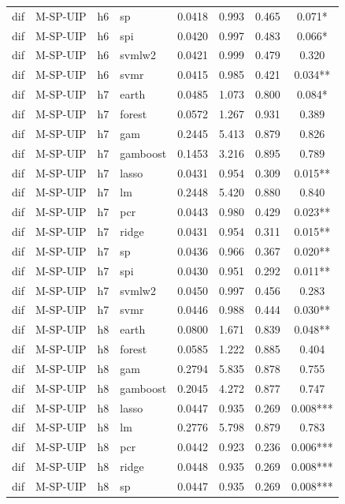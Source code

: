 \begin{ThreePartTable}
\begin{longtable}[t]{llclcccc}
dif & M-SP-UIP & h6 & sp & 0.0418 & 0.993 & 0.465 & 0.071*\\
dif & M-SP-UIP & h6 & spi & 0.0420 & 0.997 & 0.483 & 0.066*\\
dif & M-SP-UIP & h6 & svmlw2 & 0.0421 & 0.999 & 0.479 & 0.320\\
dif & M-SP-UIP & h6 & svmr & 0.0415 & 0.985 & 0.421 & 0.034**\\
\addlinespace
dif & M-SP-UIP & h7 & earth & 0.0485 & 1.073 & 0.800 & 0.084*\\
dif & M-SP-UIP & h7 & forest & 0.0572 & 1.267 & 0.931 & 0.389\\
dif & M-SP-UIP & h7 & gam & 0.2445 & 5.413 & 0.879 & 0.826\\
dif & M-SP-UIP & h7 & gamboost & 0.1453 & 3.216 & 0.895 & 0.789\\
dif & M-SP-UIP & h7 & lasso & 0.0431 & 0.954 & 0.309 & 0.015**\\
dif & M-SP-UIP & h7 & lm & 0.2448 & 5.420 & 0.880 & 0.840\\
dif & M-SP-UIP & h7 & pcr & 0.0443 & 0.980 & 0.429 & 0.023**\\
dif & M-SP-UIP & h7 & ridge & 0.0431 & 0.954 & 0.311 & 0.015**\\
dif & M-SP-UIP & h7 & sp & 0.0436 & 0.966 & 0.367 & 0.020**\\
dif & M-SP-UIP & h7 & spi & 0.0430 & 0.951 & 0.292 & 0.011**\\
dif & M-SP-UIP & h7 & svmlw2 & 0.0450 & 0.997 & 0.456 & 0.283\\
dif & M-SP-UIP & h7 & svmr & 0.0446 & 0.988 & 0.444 & 0.030**\\
\addlinespace
dif & M-SP-UIP & h8 & earth & 0.0800 & 1.671 & 0.839 & 0.048**\\
dif & M-SP-UIP & h8 & forest & 0.0585 & 1.222 & 0.885 & 0.404\\
dif & M-SP-UIP & h8 & gam & 0.2794 & 5.835 & 0.878 & 0.755\\
dif & M-SP-UIP & h8 & gamboost & 0.2045 & 4.272 & 0.877 & 0.747\\
dif & M-SP-UIP & h8 & lasso & 0.0447 & 0.935 & 0.269 & 0.008***\\
dif & M-SP-UIP & h8 & lm & 0.2776 & 5.798 & 0.879 & 0.783\\
dif & M-SP-UIP & h8 & pcr & 0.0442 & 0.923 & 0.236 & 0.006***\\
dif & M-SP-UIP & h8 & ridge & 0.0448 & 0.935 & 0.269 & 0.008***\\
dif & M-SP-UIP & h8 & sp & 0.0447 & 0.935 & 0.269 & 0.008***\\

\end{longtable}
\end{ThreePartTable}
